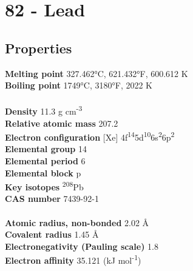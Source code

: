 \section{82 - Lead}
\label{sec:elem-lead}
\subsection{Properties}
\textbf{Melting point} 327.462°C, 621.432°F, 600.612 K\\
\textbf{Boiling point} 1749°C, 3180°F, 2022 K\\
\\
\textbf{Density} 11.3 g cm\textsuperscript{-3}\\
\textbf{Relative atomic mass} 207.2\\
\textbf{Electron configuration} [Xe] 4f\textsuperscript{14}5d\textsuperscript{10}6s\textsuperscript{2}6p\textsuperscript{2}\\
\textbf{Elemental group} 14\\
\textbf{Elemental period} 6\\
\textbf{Elemental block} p\\
\textbf{Key isotopes} \textsuperscript{208}Pb\\
\textbf{CAS number} 7439-92-1\\
\\
\textbf{Atomic radius, non-bonded} 2.02 Å\\
\textbf{Covalent radius} 1.45 Å\\
\textbf{Electronegativity (Pauling scale)} 1.8\\
\textbf{Electron affinity} 35.121 (kJ mol\textsuperscript{-1})\\